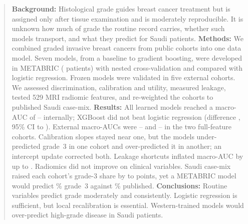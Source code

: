 \begin{abstract}
\textbf{Background:} Histological grade guides breast cancer treatment but is assigned only after
tissue examination and is moderately reproducible. It is unknown how much of grade the routine record
carries, whether such models transport, and what they predict for Saudi patients.
\textbf{Methods:} We combined \NGradedTotal{} graded invasive breast cancers from \NGradedCohorts{}
public cohorts into one data model. Seven models, from a baseline to gradient boosting, were
developed in METABRIC (\NMetabric{} patients) with nested cross-validation and compared with
logistic regression. Frozen models were validated in five external cohorts. We assessed
discrimination, calibration and utility, measured leakage, tested 529 MRI radiomic features, and
re-weighted the cohorts to published Saudi case-mix.
\textbf{Results:} All learned models reached a macro-AUC of \IntAucMinR--\IntAucMaxR{} internally;
XGBoost did not beat logistic regression (difference \XgbDeltaInt, 95\% CI \XgbDeltaIntLo{} to
\XgbDeltaIntHi). External macro-AUCs were \FullMskMin--\FullMskMax{} and \FullDukeMin--\FullDukeMax{}
in the two full-feature cohorts. Calibration slopes stayed near one, but the models under-predicted
grade~3 in one cohort and over-predicted it in another; an intercept update corrected both. Leakage
shortcuts inflated macro-AUC by up to \LeakMaxInfl. Radiomics did not improve on clinical variables.
Saudi case-mix raised each cohort's grade-3 share by \ShiftMin{} to \ShiftMax{} points, yet a
METABRIC model would predict \PredGThreeMet\% grade~3 against \SaudiGThreeA\% published.
\textbf{Conclusions:} Routine variables predict grade moderately and consistently. Logistic
regression is sufficient, but local recalibration is essential. Western-trained models would
over-predict high-grade disease in Saudi patients.
\end{abstract}
